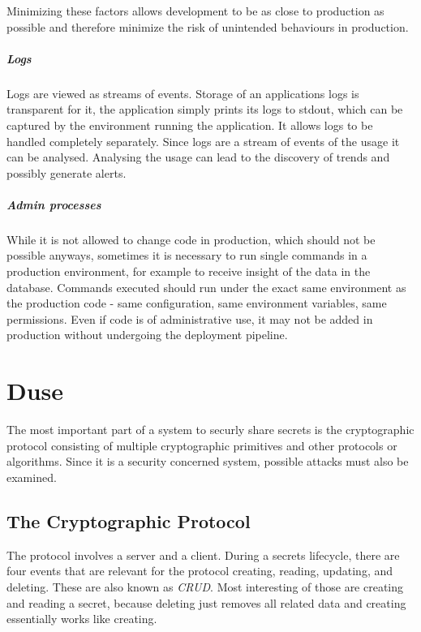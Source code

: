 Minimizing these factors allows development to be as close to production as
possible and therefore minimize the risk of unintended behaviours in
production.

\paragraph{Logs}

Logs are viewed as streams of events. Storage of an applications logs is
transparent for it, the application simply prints its logs to stdout, which can
be captured by the environment running the application. It allows logs to be
handled completely separately. Since logs are a stream of events of the usage
it can be analysed. Analysing the usage can lead to the discovery of trends and
possibly generate alerts.

\paragraph{Admin processes}

While it is not allowed to change code in production, which should not be
possible anyways, sometimes it is necessary to run single commands in a
production environment, for example to receive insight of the data in the
database. Commands executed should run under the exact same environment as the
production code - same configuration, same environment variables, same
permissions. Even if code is of administrative use, it may not be added in
production without undergoing the deployment pipeline.

\chapter{Duse}

The most important part of a system to securly share secrets is the
cryptographic protocol consisting of multiple cryptographic primitives and
other protocols or algorithms. Since it is a security concerned system,
possible attacks must also be examined.

\section{The Cryptographic Protocol}
\label{sec:duse:crypto_protocol}

The protocol involves a server and a client. During a secrets lifecycle, there
are four events that are relevant for the protocol creating, reading, updating,
and deleting. These are also known as \textit{CRUD}. Most interesting of those
are creating and reading a secret, because deleting just removes all related
data and creating essentially works like creating.

